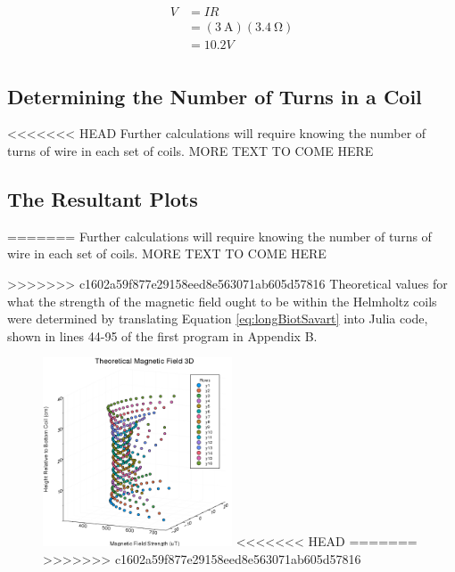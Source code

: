 \documentclass[a4paper]{article}
\begin{document}
\begin{align*}
V &= IR \\
  &= (\SI{3}{\ampere})(\SI{3.4}{\ohm}) \\
  &= 10.2V \\
\end{align*}

\subsection{Determining the Number of Turns in a Coil}

<<<<<<< HEAD
Further calculations will require knowing the number of turns of wire
in each set of coils. MORE TEXT TO COME HERE
\subsection{The Resultant Plots}
=======
\qq Further calculations will require knowing the number of turns of wire in each
set of coils. MORE TEXT TO COME HERE

>>>>>>> c1602a59f877e29158eed8e563071ab605d57816
\qq Theoretical values for what the strength of the magnetic field ought to be
within the Helmholtz coils were determined by translating Equation
\ref{eq:longBiotSavart} into Julia code, shown in lines 44-95 of the first
program in Appendix B. 

\begin{figure}[H]
\centering
\includegraphics[width=0.5\textwidth]{3DPlotTheoretical.png}
<<<<<<< HEAD
=======
>>>>>>> c1602a59f877e29158eed8e563071ab605d57816
\label{Theoretical 3-D plot}
\end{figure}
\end{document}
